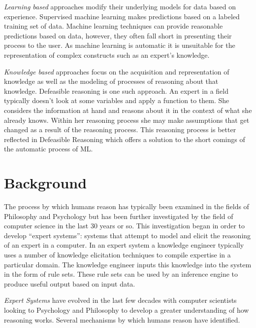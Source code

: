 \textit{Learning based} approaches modify their underlying models for data based on experience. Supervised machine learning makes predictions based on a labeled training set of data. Machine learning techniques can provide reasonable predictions based on data, however, they often fall short in presenting their process to the user. As machine learning is automatic it is unsuitable for the representation of complex constructs such as an expert's knowledge.

\textit{Knowledge based} approaches focus on the acquisition and representation of knowledge as well as the modeling of processes of reasoning about that knowledge. Defeasible reasoning is one such approach. An expert in a field typically doesn't look at some variables and apply a function to them. She considers the information at hand and reasons about it in the context of what she already knows. Within her reasoning process she may make assumptions that get changed as a result of the reasoning process. This reasoning process is better reflected in Defeasible Reasoning which offers a solution to the short comings of the automatic process of ML.


\section{Background}

The process by which humans reason has typically been examined in the fields of Philosophy and Psychology but has been further investigated by the field of computer science in the last 30 years or so. This investigation began in order to develop ``expert systems'': systems that attempt to model and elicit the reasoning of an expert in a computer. In an expert system a knowledge engineer typically uses a number of knowledge elicitation techniques to compile expertise in a particular domain. The knowledge engineer inputs this knowledge into the system in the form of rule sets. These rule sets can be used by an inference engine to produce useful output based on input data. 

\textit{Expert Systems} have evolved in the last few decades with computer scientists looking to Psychology and Philosophy to develop a greater understanding of how reasoning works. Several mechanisms by which humans reason have identified.

